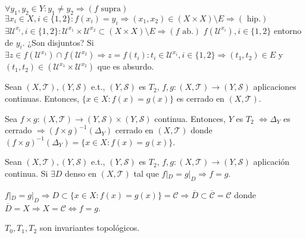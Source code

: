\begin{dem}
  $\forall y_{1}, y_{2} \in Y : y_{1} \neq y_{2} \Rightarrow (f \text{ supra})$ $\exists x_{i} \in X, i \in \{  1, 2 \}: f(x_{i}) = y_{i} \Rightarrow (x_{1}, x_{2}) \in (X \times X) \setminus E \Rightarrow (\text{ hip.})$ $ \exists \mathcal{U}^{x_{i}}, i \in \{  1, 2 \}: \mathcal{U}^{x_{1}} \times \mathcal{U}^{x_{2}} \subset (X \times X) \setminus E \Rightarrow (f \text{ ab.})$ $f(\mathcal{U}^{x_{i}}), i \in \{  1, 2 \}$ entorno de $y_{i}$. ¿Son disjuntos? Si $ \exists z \in f(\mathcal{U}^{x_{1}}) \cap f(\mathcal{U}^{x_{2}}) \Rightarrow z = f(t_{i}) : t_{i}  \in \mathcal{U}^{x_{i}}, i \in \{ 1, 2 \} \Rightarrow (t_{1}, t_{2}) \in E$ y $ (t_{1}, t_{2}) \in (\mathcal{U}^{x_{1}} \times \mathcal{U}^{x_{2}})$ que es absurdo.
\end{dem}

\begin{prop}
  Sean $( X, \mathcal{T} ), ( Y, \mathcal{S} )$ e.t., $( Y, \mathcal{S} )$ es $T_{2}$, $f, g: ( X, \mathcal{T} ) \to ( Y, \mathcal{S} )$ aplicaciones continuas. Entonces, $\{ x \in X :  f(x) = g(x) \}$ es cerrado en $( X, \mathcal{T} )$.
\end{prop}
 
\begin{dem}
  Sea $f \times g: ( X, \mathcal{T} ) \to ( Y, \mathcal{S} ) \times ( Y, \mathcal{S} )$ continua. Entonces, $Y$ es $T_{2}$ $\Leftrightarrow \Delta_{Y}$ es cerrado $\Rightarrow (f \times g)^{-1}(\Delta_{Y})$ cerrado en $( X, \mathcal{T} )$ donde $(f \times g)^{-1}(\Delta_{Y}) = \{  x \in X : f(x) = g(x) \}$.
\end{dem}

\begin{cor}
  Sean $( X, \mathcal{T} ), ( Y, \mathcal{S} )$ e.t., $( Y, \mathcal{S} )$ es $T_{2}$, $f,g: ( X, \mathcal{T} ) \to ( Y, \mathcal{S} )$ aplicación continua. Si $\exists D$ denso en $ ( X, \mathcal{T} )$ tal que $ f|_{D} = g|_{D} \Rightarrow f= g$.
\end{cor}
 
\begin{dem}
  $f|_{D} = g|_{D} \Rightarrow D \subset \{ x \in X : f(x) = g(x) \} = \mathcal{C} \Rightarrow \overline{D} \subset \overline{\mathcal{C}} = \mathcal{C}$ donde $\overline{D} = X \Rightarrow X = \mathcal{C} \Leftrightarrow f = g$.
\end{dem}

\begin{obs}
  $T_{0}, T_{1}, T_{2}$ son invariantes topológicos.
\end{obs}

